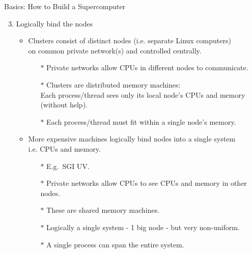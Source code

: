 
\begin{frame}{Basics: How to Build a Supercomputer}
\begin{enumerate}
\setcounter{enumi}{2}
\item{Logically bind the nodes}
\begin{itemize}
\item{Clusters consist of distinct nodes (i.e. separate Linux computers)\hfill\\
on common private network(s) and controlled centrally.}
\begin{itemize}
\item[$\ast$]{Private networks allow CPUs in different nodes to communicate.}
\pause
\item[$\ast$]{Clusters are \alert{distributed memory} machines:\hfill\\
\alert{Each process/thread sees only its local node's CPUs and memory (without help).}}
\pause
\item[$\ast$]{\color{red}Each process/thread must fit within a single node's memory.}
\end{itemize}
\pause
\item{More expensive machines logically bind nodes into a single system\hfill\\
{}\qquad i.e. CPUs \alert{and} memory.}
\begin{itemize}
\item[$\ast$]{E.g.\ SGI UV.}
\item[$\ast$]{Private networks allow CPUs to see CPUs and memory in other nodes.}
\pause
\item[$\ast$]{These are \alert{shared memory} machines.}
\item[$\ast$]{Logically a single system - 1 big node - but very non-uniform.}
\item[$\ast$]{A single process can span the entire system.}
\end{itemize}
\end{itemize}
\end{enumerate}
\end{frame}

